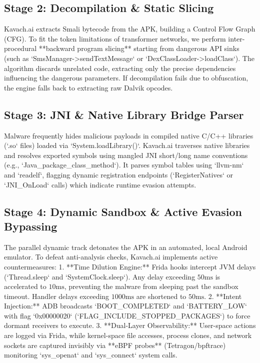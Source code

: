 \documentclass[conference]{IEEEtran}
\begin{document}
\subsection{Stage 2: Decompilation \& Static Slicing}
Kavach.ai extracts Smali bytecode from the APK, building a Control Flow Graph (CFG). To fit the token limitations of transformer networks, we perform inter-procedural **backward program slicing** starting from dangerous API sinks (such as `SmsManager->sendTextMessage` or `DexClassLoader->loadClass`). The algorithm discards unrelated code, extracting only the precise dependencies influencing the dangerous parameters. If decompilation fails due to obfuscation, the engine falls back to extracting raw Dalvik opcodes.

\subsection{Stage 3: JNI \& Native Library Bridge Parser}
Malware frequently hides malicious payloads in compiled native C/C++ libraries (`.so` files) loaded via `System.loadLibrary()`. Kavach.ai traverses native libraries and resolves exported symbols using mangled JNI short/long name conventions (e.g., `Java_package_class_method`). It parses symbol tables using `llvm-nm` and `readelf`, flagging dynamic registration endpoints (`RegisterNatives` or `JNI_OnLoad` calls) which indicate runtime evasion attempts.

\subsection{Stage 4: Dynamic Sandbox & Active Evasion Bypassing}
The parallel dynamic track detonates the APK in an automated, local Android emulator. To defeat anti-analysis checks, Kavach.ai implements active countermeasures:
1. **Time Dilution Engine:** Frida hooks intercept JVM delays (`Thread.sleep` and `SystemClock.sleep`). Any delay exceeding $50\text{ms}$ is accelerated to $10\text{ms}$, preventing the malware from sleeping past the sandbox timeout. Handler delays exceeding $1000\text{ms}$ are shortened to $50\text{ms}$.
2. **Intent Injection:** ADB broadcasts `BOOT_COMPLETED` and `BATTERY_LOW` with flag `0x00000020` (`FLAG_INCLUDE_STOPPED_PACKAGES`) to force dormant receivers to execute.
3. **Dual-Layer Observability:** User-space actions are logged via Frida, while kernel-space file accesses, process clones, and network sockets are captured invisibly via **eBPF probes** (Tetragon/bpftrace) monitoring `sys_openat` and `sys_connect` system calls.
\end{document}
